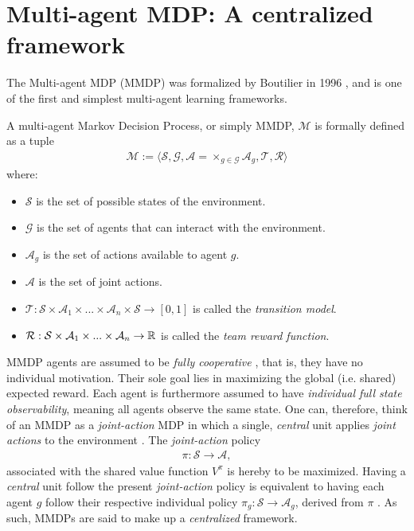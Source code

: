 \section{Multi-agent MDP: A centralized framework}
\label{sec:mmdp}
The Multi-agent MDP (MMDP) was formalized by Boutilier in 1996 \cite{Boutilier}, and is one of the first and simplest multi-agent learning frameworks.
\begin{definition}
\label{def:mmdp}
A multi-agent Markov Decision Process, or simply MMDP, $\mathcal{M}$ is formally defined as a tuple
\begin{align*}
    \mathcal{M} := \big \langle \mathcal{S}, \mathcal{G}, \mathcal{A} = \times_{g \in \mathcal{G}} \mathcal{A}_g, \mathcal{T}, \mathcal{R} \big \rangle
  \end{align*}
where:
\begin{itemize}
    \item $\mathcal{S}$ is the set of possible states of the environment.
    \item $\mathcal{G}$ is the set of agents that can interact with the environment.
    \item $\mathcal{A}_g$ is the set of actions available to agent $g$.
    \item $\mathcal{A}$ is the set of joint actions.
    \item $\mathcal{T} : \mathcal{S} \times \mathcal{A}_1 \times ... \times \mathcal{A}_n \times  \mathcal{S} \rightarrow [0,1]$ is called the \textit{transition model}. 
    \item $\mathcal{R}: \mathcal{S} \times \mathcal{A}_1 \times ... \times \mathcal{A}_n \rightarrow \mathbb{R}$ is called the \textit{team reward function}.
\end{itemize}
\end{definition}



MMDP agents are assumed to be \textit{fully cooperative} \cite{Boutilier}, that is, they have no individual motivation. Their sole goal lies in maximizing the global (i.e. shared) expected reward. Each agent is furthermore assumed to have \textit{individual full state observability}, meaning all agents observe the same state. One can, therefore, think of an MMDP as a \textit{joint-action} MDP in which a single, \textit{central} unit applies \textit{joint actions} to the environment \cite{oliehoek}. The \textit{joint-action} policy 
\begin{align}
    \pi : \mathcal{S} \rightarrow \mathcal{A},
\end{align}
associated with the shared value function $V^{\pi}$ is hereby to be maximized. Having a \textit{central} unit follow the present \textit{joint-action} policy is equivalent to having each agent $g$ follow their respective individual policy $\pi_g : \mathcal{S} \rightarrow \mathcal{A}_g$, derived from $\pi$ \cite{oliehoek}. As such, MMDPs are said to make up a \textit{centralized} framework.



